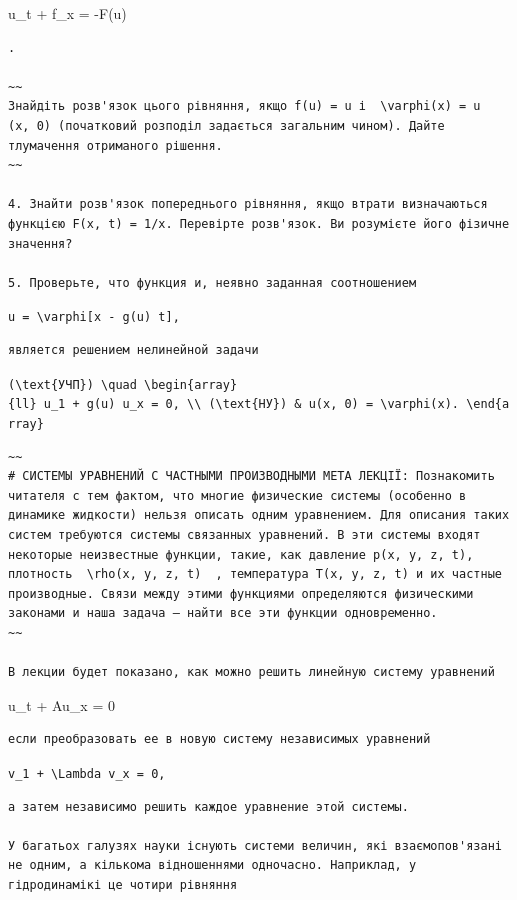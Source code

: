 \documentclass[
  ukrainian,
]{article}
\begin{document}
u\_t + f\_x = -F(u)

\begin{verbatim}
.

~~
Знайдіть розв'язок цього рівняння, якщо f(u) = u і  \varphi(x) = u  (x, 0) (початковий розподіл задається загальним чином). Дайте тлумачення отриманого рішення.
~~

4. Знайти розв'язок попереднього рівняння, якщо втрати визначаються функцією F(x, t) = 1/x. Перевірте розв'язок. Ви розумієте його фізичне значення?

5. Проверьте, что функция и, неявно заданная соотношением
\end{verbatim}

\texttt{u\ =\ \textbackslash{}varphi{[}x\ -\ g(u)\ t{]},}

\begin{verbatim}
является решением нелинейной задачи
\end{verbatim}

\texttt{(\textbackslash{}text\{УЧП\})\ \textbackslash{}quad\ \textbackslash{}begin\{array\}\{ll\}\ u\_1\ +\ g(u)\ u\_x\ =\ 0,\ \textbackslash{}\textbackslash{}\ (\textbackslash{}text\{НУ\})\ \&\ u(x,\ 0)\ =\ \textbackslash{}varphi(x).\ \textbackslash{}end\{array\}}

\begin{verbatim}
~~
# СИСТЕМЫ УРАВНЕНИЙ С ЧАСТНЫМИ ПРОИЗВОДНЫМИ МЕТА ЛЕКЦІЇ: Познакомить читателя с тем фактом, что многие физические системы (особенно в динамике жидкости) нельзя описать одним уравнением. Для описания таких систем требуются системы связанных уравнений. В эти системы входят некоторые неизвестные функции, такие, как давление p(x, y, z, t), плотность  \rho(x, y, z, t)  , температура T(x, y, z, t) и их частные производные. Связи между этими функциями определяются физическими законами и наша задача — найти все эти функции одновременно.
~~

В лекции будет показано, как можно решить линейную систему уравнений
\end{verbatim}

u\_t + Au\_x = 0

\begin{verbatim}
если преобразовать ее в новую систему независимых уравнений
\end{verbatim}

\texttt{v\_1\ +\ \textbackslash{}Lambda\ v\_x\ =\ 0,}

\begin{verbatim}
а затем независимо решить каждое уравнение этой системы.

У багатьох галузях науки існують системи величин, які взаємопов'язані не одним, а кількома відношеннями одночасно. Наприклад, у гідродинамікі це чотири рівняння
\end{verbatim}
\end{document}

